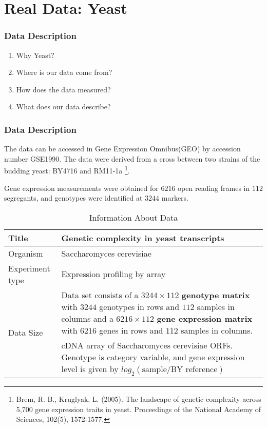 \section{Real Data: Yeast}
\begin{frame}
    \sectionpage
\end{frame}

\begin{frame}\frametitle{Data Description}
    \begin{enumerate}
        \item Why Yeast?
        \item Where is our data come from? 
        \item How does the data measured? 
        \item What does our data describe? 
    \end{enumerate}
\end{frame}

\begin{frame}
    \frametitle{Data Description}
    The data can be accessed in Gene Expression Omnibus(GEO) by accession number GSE1990. 
    The data were derived from a cross between two strains of the budding yeast: BY4716 and RM11-1a \footnote[1]{Brem, R. B., Kruglyak, L. (2005). The landscape of genetic complexity across 5,700 gene expression traits in yeast. Proceedings of the National Academy of Sciences, 102(5), 1572-1577.}. 

    Gene expression measurements were obtained for $6216$ open reading frames in $112$ segregants, and genotypes were identified at $3244$ markers. 

\end{frame}

\begin{frame}
    \begin{table}[h]
        \centering
        \begin{tabular}{|l|p{7cm}|}
            \hline
            Title                           &   Genetic complexity in yeast transcripts \\ \hline
            Organism                        &   Saccharomyces cerevisiae                \\ \hline
            Experiment type                 &   Expression profiling by array           \\ \hline
            \multirow{4}{*}{Data Size}      &   Data set consists of a $3244\times112$ \textbf{genotype matrix} with $3244$ genotypes in rows and $112$ samples in columns and a $6216\times112$ \textbf{gene expression matrix} with $6216$ genes in rows and $112$ samples in columns.  \\ \hline
            \multirow{3}{*}{Description}    &   cDNA array of Saccharomyces cerevisiae ORFs. Genotype is category variable, and gene expression level is given by  $log_2(\text{sample} / \text{BY reference})$\\ 
            \hline
        \end{tabular}
        \caption{Information About Data}
    \end{table}

\end{frame}

